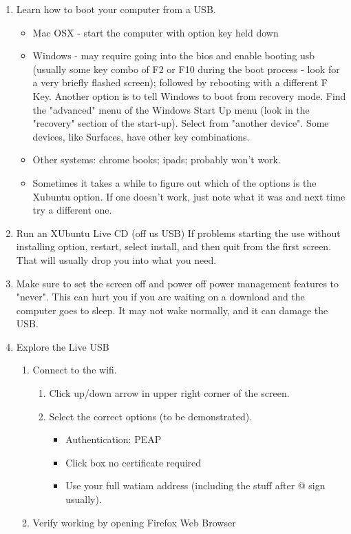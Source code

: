\documentclass{article}
\begin{document}
\begin{enumerate}
\item Learn how to boot your computer from a USB. 
\begin{itemize}
\item Mac OSX - start the computer with option key held down
\item Windows - may require going into the bios and enable booting usb (usually some key combo of F2 or F10 during the boot process - look for a very briefly flashed screen); followed by rebooting with a different F Key. Another option is to tell Windows to boot from recovery mode. Find the "advanced" menu of the Windows Start Up menu (look in the "recovery" section of the start-up). Select from "another device". Some devices, like Surfaces, have other key combinations.
\item Other systems: chrome books; ipads; probably won't work.
\item Sometimes it takes a while to figure out which of the options is the Xubuntu option. If one doesn't work, just note what it was and next time try a different one.
\end{itemize}
\item Run an XUbuntu Live CD (off us USB)
If problems starting the use without installing option, restart, select install, and then quit from the first screen. That will usually drop you into what you need.
\item Make sure to set the screen off and power off power management features to "never". This can hurt you if you are waiting on a download and the computer goes to sleep. It may not wake normally, and it can damage the USB.
\item Explore the Live USB
\begin{enumerate}
\item Connect to the wifi.
\begin{enumerate}
\item Click up/down arrow in upper right corner of the screen.
\item Select the correct options (to be demonstrated).
\begin{itemize}
\item Authentication: PEAP
\item Click box no certificate required
\item Use your full watiam address (including the stuff after @ sign usually).
\end{itemize}
\end{enumerate}
\item Verify working by opening Firefox Web Browser

\end{enumerate}
\end{enumerate}
\end{document}
